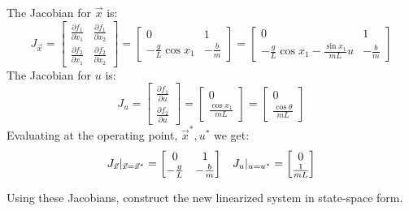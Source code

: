 \begin{enumerate}
{    The Jacobian for $\vec{x}$ is:
    $$J_{\vec{x}} =
    \begin{bmatrix} \frac{\partial f_{1}}{\partial x_{1}} & \frac{\partial f_{1}}{\partial x_{2}} \\
    \frac{\partial f_{2}}{\partial x_{1}} & \frac{\partial f_{2}}{\partial x_{2}}
    \end{bmatrix} = 
    \begin{bmatrix} 0 & 1 \\
    -\frac{g}{L} \cos x_{1} & -\frac{b}{m} 
    \end{bmatrix} = 
    \begin{bmatrix} 0 & 1 \\
    -\frac{g}{L} \cos x_1 - \frac{\sin{x_1}}{mL} u & -\frac{b}{m} 
    \end{bmatrix}
    $$
    The Jacobian for $u$ is:
    $$J_{u} =
    \begin{bmatrix} \frac{\partial f_{1}}{\partial u} \\ \frac{\partial f_{2}}{\partial u} \end{bmatrix} =
    \begin{bmatrix} 0 \\ \frac{\cos x_{1}}{mL} \end{bmatrix} = 
    \begin{bmatrix} 0 \\ \frac{\cos \theta}{mL} \end{bmatrix}
    $$
    Evaluating at the operating point, $\vec{x}^{*}, u^{*}$ we get:
    $$J_{\vec{x}} |_{\vec{x} = \vec{x}^{*}} =
    \begin{bmatrix} 0 & 1 \\
    -\frac{g}{L} & -\frac{b}{m} 
    \end{bmatrix} \hspace{0.3 cm}
    J_{u} |_{u = u^{*}} =
    \begin{bmatrix} 0 \\ \frac{1}{mL} \end{bmatrix}
    $$
  }

  \qitem Using these Jacobians, construct the new linearized system in state-space form.



\end{enumerate}
